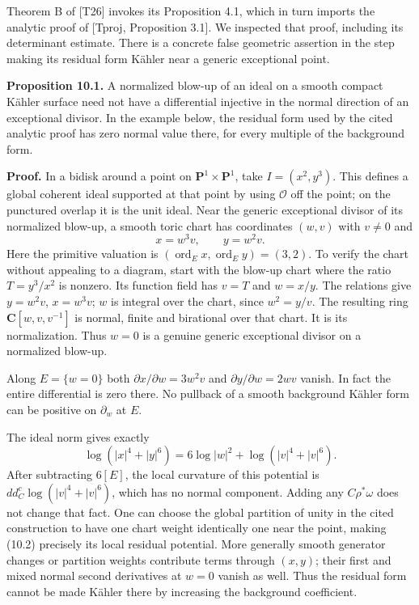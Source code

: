 \documentclass[
  11pt,
]{article}
\begin{document}
Theorem B of {[}T26{]} invokes its Proposition 4.1, which in turn
imports the analytic proof of {[}Tproj, Proposition 3.1{]}. We inspected
that proof, including its determinant estimate. There is a concrete
false geometric assertion in the step making its residual form Kähler
near a generic exceptional point.

\textbf{Proposition 10.1.} A normalized blow-up of an ideal on a smooth
compact Kähler surface need not have a differential injective in the
normal direction of an exceptional divisor. In the example below, the
residual form used by the cited analytic proof has zero normal value
there, for every multiple of the background form.

\textbf{Proof.} In a bidisk around a point on
\(\mathbf P^1\times\mathbf P^1\), take \(I=(x^2,y^3)\). This defines a
global coherent ideal supported at that point by using \(\mathcal O\)
off the point; on the punctured overlap it is the unit ideal. Near the
generic exceptional divisor of its normalized blow-up, a smooth toric
chart has coordinates \((w,v)\) with \(v\ne0\) and \[
 x=w^3v,\qquad y=w^2v.                                    \tag{10.1}
\] Here the primitive valuation is
\((\operatorname{ord}_Ex,\operatorname{ord}_Ey)=(3,2)\). To verify the
chart without appealing to a diagram, start with the blow-up chart where
the ratio \(T=y^3/x^2\) is nonzero. Its function field has \(v=T\) and
\(w=x/y\). The relations give \(y=w^2v\), \(x=w^3v\); \(w\) is integral
over the chart, since \(w^2=y/v\). The resulting ring
\(\mathbf C[w,v,v^{-1}]\) is normal, finite and birational over that
chart. It is its normalization. Thus \(w=0\) is a genuine generic
exceptional divisor on a normalized blow-up.

Along \(E=\{w=0\}\) both \(\partial x/\partial w=3w^2v\) and
\(\partial y/\partial w=2wv\) vanish. In fact the entire differential is
zero there. No pullback of a smooth background Kähler form can be
positive on \(\partial_w\) at \(E\).

The ideal norm gives exactly \[
 \log(|x|^4+|y|^6)
 =6\log|w|^2+\log(|v|^4+|v|^6).                           \tag{10.2}
\] After subtracting \(6[E]\), the local curvature of this potential is
\(dd^c_C\log(|v|^4+|v|^6)\), which has no normal component. Adding any
\(C\rho^*\omega\) does not change that fact. One can choose the global
partition of unity in the cited construction to have one chart weight
identically one near the point, making (10.2) precisely its local
residual potential. More generally smooth generator changes or partition
weights contribute terms through \((x,y)\); their first and mixed normal
second derivatives at \(w=0\) vanish as well. Thus the residual form
cannot be made Kähler there by increasing the background coefficient.
\end{document}

